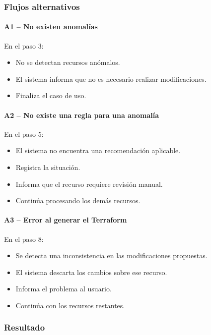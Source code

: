 \subsubsection*{Flujos alternativos}

\paragraph{A1 -- No existen anomalías}

En el paso 3:

\begin{itemize}
\item No se detectan recursos anómalos.
\item El sistema informa que no es necesario realizar modificaciones.
\item Finaliza el caso de uso.
\end{itemize}

\paragraph{A2 -- No existe una regla para una anomalía}

En el paso 5:

\begin{itemize}
\item El sistema no encuentra una recomendación aplicable.
\item Registra la situación.
\item Informa que el recurso requiere revisión manual.
\item Continúa procesando los demás recursos.
\end{itemize}

\paragraph{A3 -- Error al generar el Terraform}

En el paso 8:

\begin{itemize}
\item Se detecta una inconsistencia en las modificaciones propuestas.
\item El sistema descarta los cambios sobre ese recurso.
\item Informa el problema al usuario.
\item Continúa con los recursos restantes.
\end{itemize}

\subsubsection*{Resultado}

